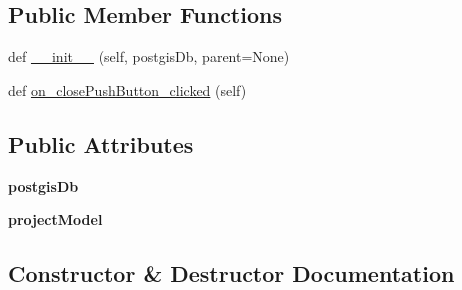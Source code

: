 \subsection*{Public Member Functions}
\begin{DoxyCompactItemize}
\item 
def \mbox{\hyperlink{class_dsg_tools_1_1_validation_tools_1_1validation__history_1_1_validation_history_ade81e00ff9ee4659bc389f57b4b6300f}{\+\_\+\+\_\+init\+\_\+\+\_\+}} (self, postgis\+Db, parent=None)
\item 
def \mbox{\hyperlink{class_dsg_tools_1_1_validation_tools_1_1validation__history_1_1_validation_history_a2d911ac394ea749f94e7c27b75153ff9}{on\+\_\+close\+Push\+Button\+\_\+clicked}} (self)
\end{DoxyCompactItemize}
\subsection*{Public Attributes}
\begin{DoxyCompactItemize}
\item 
\mbox{\label{class_dsg_tools_1_1_validation_tools_1_1validation__history_1_1_validation_history_af7082e55be68f98c7ff3dc3b985647c6}} 
{\bfseries postgis\+Db}
\item 
\mbox{\label{class_dsg_tools_1_1_validation_tools_1_1validation__history_1_1_validation_history_a91047df5a279457f072d4a0bbb2544d1}} 
{\bfseries project\+Model}
\end{DoxyCompactItemize}


\subsection{Constructor \& Destructor Documentation}
\mbox{\label{class_dsg_tools_1_1_validation_tools_1_1validation__history_1_1_validation_history_ade81e00ff9ee4659bc389f57b4b6300f}} 
